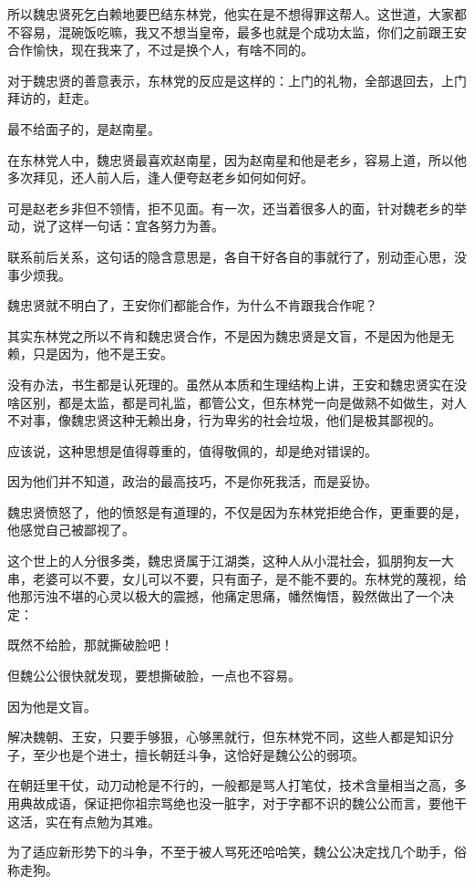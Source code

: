 \begin{multicols}{\theparacolNo}
所以魏忠贤死乞白赖地要巴结东林党，他实在是不想得罪这帮人。这世道，大家都不容易，混碗饭吃嘛，我又不想当皇帝，最多也就是个成功太监，你们之前跟王安合作愉快，现在我来了，不过是换个人，有啥不同的。

对于魏忠贤的善意表示，东林党的反应是这样的：上门的礼物，全部退回去，上门拜访的，赶走。

最不给面子的，是赵南星。

在东林党人中，魏忠贤最喜欢赵南星，因为赵南星和他是老乡，容易上道，所以他多次拜见，还人前人后，逢人便夸赵老乡如何如何好。

可是赵老乡非但不领情，拒不见面。有一次，还当着很多人的面，针对魏老乡的举动，说了这样一句话：宜各努力为善。

联系前后关系，这句话的隐含意思是，各自干好各自的事就行了，别动歪心思，没事少烦我。

魏忠贤就不明白了，王安你们都能合作，为什么不肯跟我合作呢？

其实东林党之所以不肯和魏忠贤合作，不是因为魏忠贤是文盲，不是因为他是无赖，只是因为，他不是王安。

没有办法，书生都是认死理的。虽然从本质和生理结构上讲，王安和魏忠贤实在没啥区别，都是太监，都是司礼监，都管公文，但东林党一向是做熟不如做生，对人不对事，像魏忠贤这种无赖出身，行为卑劣的社会垃圾，他们是极其鄙视的。

应该说，这种思想是值得尊重的，值得敬佩的，却是绝对错误的。

因为他们并不知道，政治的最高技巧，不是你死我活，而是妥协。

魏忠贤愤怒了，他的愤怒是有道理的，不仅是因为东林党拒绝合作，更重要的是，他感觉自己被鄙视了。

这个世上的人分很多类，魏忠贤属于江湖类，这种人从小混社会，狐朋狗友一大串，老婆可以不要，女儿可以不要，只有面子，是不能不要的。东林党的蔑视，给他那污浊不堪的心灵以极大的震撼，他痛定思痛，幡然悔悟，毅然做出了一个决定：

既然不给脸，那就撕破脸吧！

但魏公公很快就发现，要想撕破脸，一点也不容易。

因为他是文盲。

解决魏朝、王安，只要手够狠，心够黑就行，但东林党不同，这些人都是知识分子，至少也是个进士，擅长朝廷斗争，这恰好是魏公公的弱项。

在朝廷里干仗，动刀动枪是不行的，一般都是骂人打笔仗，技术含量相当之高，多用典故成语，保证把你祖宗骂绝也没一脏字，对于字都不识的魏公公而言，要他干这活，实在有点勉为其难。

为了适应新形势下的斗争，不至于被人骂死还哈哈笑，魏公公决定找几个助手，俗称走狗。


\end{multicols}
